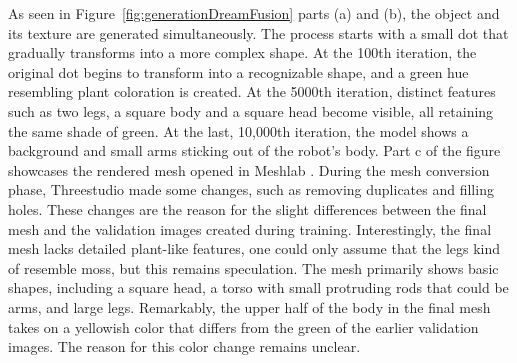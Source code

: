 As seen in Figure~\ref{fig:generationDreamFusion} parts (a) and (b), the object and its texture are generated simultaneously. The process starts with a small dot that gradually transforms into a more complex shape. At the 100th iteration, the original dot begins to transform into a recognizable shape, and a green hue resembling plant coloration is created. At the 5000th iteration, distinct features such as two legs, a square body and a square head become visible, all retaining the same shade of green. At the last, 10,000th iteration, the model shows a background and small arms sticking out of the robot's body.
Part c of the figure showcases the rendered mesh opened in Meshlab \citep{meshLab}. During the mesh conversion phase, Threestudio made some changes, such as removing duplicates and filling holes. These changes are the reason for the slight differences between the final mesh and the validation images created during training. Interestingly, the final mesh lacks detailed plant-like features, one could only assume that the legs kind of resemble moss, but this remains speculation. The mesh primarily shows basic shapes, including a square head, a torso with small protruding rods that could be arms, and large legs. Remarkably, the upper half of the body in the final mesh takes on a yellowish color that differs from the green of the earlier validation images. The reason for this color change remains unclear.\newline